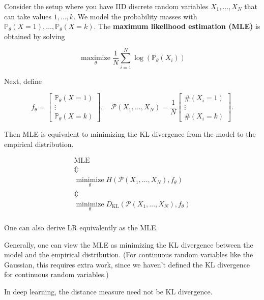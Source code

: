 \documentclass{report}
\begin{document}
\begin{concept}
    Consider the setup where you have IID discrete random variables $X_{1}, \ldots, X_{N}$ that can take values $1, \ldots, k$. We model the probability masses with $\mathbb{P}_{\theta}(X=1), \ldots, \mathbb{P}_{\theta}(X=k)$. The \textbf{maximum likelihood estimation (MLE)} is obtained by solving

    $$
    \underset{\theta}{\operatorname{maximize}} \frac{1}{N} \sum_{i=1}^{N} \log \left(\mathbb{P}_{\theta}\left(X_{i}\right)\right)
    $$

    Next, define

    $$
    f_{\theta}=\left[\begin{array}{c}
    \mathbb{P}_{\theta}(X=1) \\
    \vdots \\
    \mathbb{P}_{\theta}(X=k)
    \end{array}\right], \quad \mathcal{P}\left(X_{1}, \ldots, X_{N}\right)=\frac{1}{N}\left[\begin{array}{c}
    \#\left(X_{i}=1\right) \\
    \vdots \\
    \#\left(X_{i}=k\right)
    \end{array}\right] .
    $$

    Then MLE is equivalent to minimizing the KL divergence from the model to the empirical distribution.

    $$
    \begin{gathered}
    \text{MLE} \\
    \mathbb{\Updownarrow} \\
    \underset{\theta}{\operatorname{minimize}} H \left( \mathcal{P}\left(X_{1}, \ldots, X_{N}\right), f_{\theta}\right) \\
    \mathbb{\Updownarrow} \\
    \underset{\theta}{\operatorname{minimize}} D_{\mathrm{KL}} \left( \mathcal{P}\left(X_{1}, \ldots, X_{N}\right), f_{\theta}\right) \\
    \end{gathered}
    $$

    One can also derive LR equivalently as the MLE.

    Generally, one can view the MLE as minimizing the KL divergence between the model and the empirical distribution. (For continuous random variables like the Gaussian, this requires extra work, since we haven't defined the KL divergence for continuous random variables.)

    In deep learning, the distance measure need not be KL divergence.
\end{concept}
\end{document}
